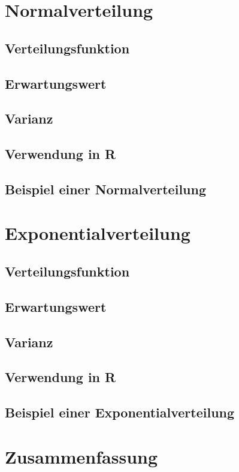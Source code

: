 \newpage
\section{Normalverteilung}
\subsection{Verteilungsfunktion}
\subsection{Erwartungswert}
\subsection{Varianz}
\subsection{Verwendung in R}
\subsection{Beispiel einer Normalverteilung}

\newpage
\section{Exponentialverteilung}
\subsection{Verteilungsfunktion}
\subsection{Erwartungswert}
\subsection{Varianz}
\subsection{Verwendung in R}
\subsection{Beispiel einer Exponentialverteilung}

\newpage
\section{Zusammenfassung}
